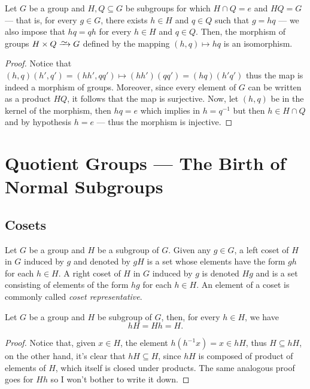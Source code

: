 \begin{proposition}
\label{prop:product-subgroups-isomorphism}
Let \(G\) be a group and \(H, Q \subseteq G\) be subgroups for which \(H \cap Q
= e\) and \(H Q = G\) --- that is, for every \(g \in G\), there exists \(h \in
H\) and \(q \in Q\) such that \(g = h q\) --- we also impose that \(h q = q h\)
for every \(h \in H\) and \(q \in Q\). Then, the morphism of groups \(H \times Q
\isoto G\) defined by the mapping \((h, q) \mapsto hq\) is an isomorphism.
\end{proposition}

\begin{proof}
Notice that \((h, q)(h', q') = (h h', q q') \mapsto (hh')(qq') = (hq)(h'q')\)
thus the map is indeed a morphism of groups. Moreover, since every element of
\(G\) can be written as a product \(HQ\), it follows that the map is
surjective. Now, let \((h, q)\) be in the kernel of the morphism, then \(hq =
e\) which implies in \(h = q^{-1}\) but then \(h \in H \cap Q\) and by
hypothesis \(h = e\) --- thus the morphism is injective.
\end{proof}

\section{Quotient Groups --- The Birth of Normal Subgroups}

\subsection{Cosets}

\begin{definition}[Coset]
\label{def:coset}
Let \(G\) be a group and \(H\) be a subgroup of \(G\). Given any \(g \in G\), a
left coset of \(H\) in \(G\) induced by \(g\) and denoted by \(g H\) is a set
whose elements have the form \(g h\) for each \(h \in H\). A right coset of
\(H\) in \(G\) induced by \(g\) is denoted \(H g\) and is a set consisting of
elements of the form \(h g\) for each \(h \in H\). An element of a coset is
commonly called \emph{coset representative}.
\end{definition}

\begin{corollary}
Let \(G\) be a group and \(H\) be subgroup of \(G\), then, for every \(h \in
H\), we have
\[
    h H = H h = H.
\]
\end{corollary}

\begin{proof}
Notice that, given \(x \in H\), the element \(h (h^{-1} x) = x \in h H\), thus
\(H \subseteq h H\), on the other hand, it's clear that \(hH \subseteq H\),
since \(hH\) is composed of product of elements of \(H\), which itself is closed
under products. The same analogous proof goes for \(Hh\) so I won't bother to
write it down.
\end{proof}

